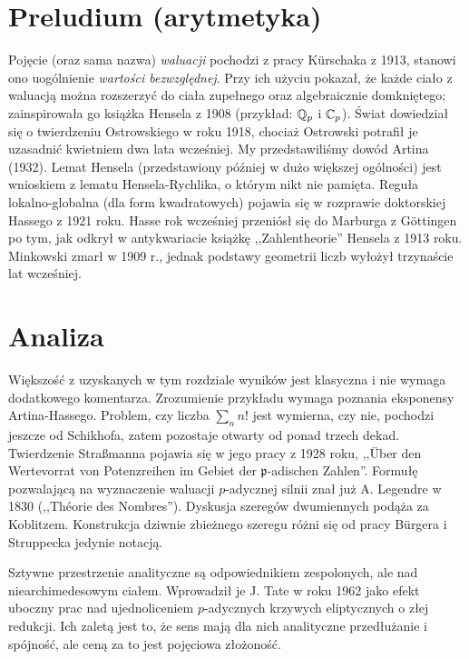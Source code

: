 \section{Preludium (arytmetyka)}
Pojęcie (oraz sama nazwa) \emph{waluacji} pochodzi z pracy Kürschaka z 1913, stanowi ono uogólnienie \emph{wartości bezwzględnej}.
Przy ich użyciu pokazał, że każde ciało z waluacją można rozszerzyć do ciała zupełnego oraz algebraicznie domkniętego; zainspirowała go książka Hensela z 1908 (przykład: $\mathbb Q_p$ i $\mathbb C_p$).
Świat dowiedział się o twierdzeniu Ostrowskiego w roku 1918, chociaż Ostrowski potrafił je uzasadnić kwietniem dwa lata wcześniej.
My przedstawiliśmy dowód Artina (1932).
Lemat Hensela (przedstawiony później w dużo większej ogólności) jest wnioskiem z lematu Hensela-Rychlika, o którym nikt nie pamięta.
Reguła lokalno-globalna (dla form kwadratowych) pojawia się w rozprawie doktorskiej Hassego z 1921 roku.
Hasse rok wcześniej przeniósł się do Marburga z Göttingen po tym, jak odkrył w antykwariacie książkę ,,Zahlentheorie'' Hensela z 1913 roku.
Minkowski zmarł w 1909 r., jednak podstawy geometrii liczb wyłożył trzynaście lat wcześniej.

\section{Analiza}
Większość z uzyskanych w tym rozdziale wyników jest klasyczna i nie wymaga dodatkowego komentarza.
Zrozumienie przykładu \label{leniwy} wymaga poznania eksponensy Artina-Hassego.
Problem, czy liczba $\sum_n n!$ jest wymierna, czy nie, pochodzi jeszcze od Schikhofa, zatem pozostaje otwarty od ponad trzech dekad.
Twierdzenie Straßmanna pojawia się w jego pracy z 1928 roku, ,,Über den Wertevorrat von Potenzreihen im Gebiet der $\mathfrak p$-adischen Zahlen''.
Formułę pozwalającą na wyznaczenie waluacji $p$-adycznej silnii znał już A. Legendre w 1830 (,,Théorie des Nombres'').
Dyskusja szeregów dwumiennych podąża za Koblitzem.
Konstrukcja dziwnie zbieżnego szeregu różni się od pracy Bürgera i Struppecka jedynie notacją.

Sztywne przestrzenie analityczne są odpowiednikiem zespolonych, ale nad niearchimedesowym ciałem.
Wprowadził je J. Tate w roku 1962 jako efekt uboczny prac nad ujednoliceniem $p$-adycznych krzywych eliptycznych o złej redukcji.
Ich zaletą jest to, że sens mają dla nich analityczne przedłużanie i spójność, ale ceną za to jest pojęciowa złożoność.